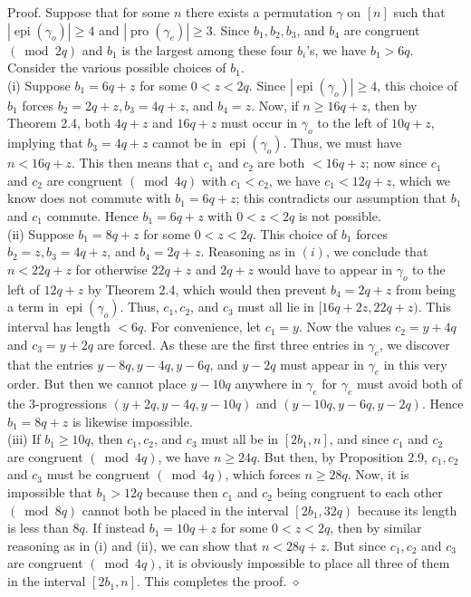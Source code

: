 \documentclass[10pt]{article}
\newcommand{\proofend}{\hfill\(\diamond\)}
\begin{document}
Proof. Suppose that for some $n$ there exists a permutation $\gamma$ on $[n]$ such that $\left|\operatorname{epi}(\gamma_o)\right| \geq 4$ and $\left|\operatorname{pro}\left(\gamma_{e}\right)\right| \geq 3$. Since $b_{1}, b_{2}, b_{3}$, and $b_{4}$ are congruent $(\bmod 2q)$ and $b_{1}$ is the largest among these four $b_i$'s, we have $b_{1}>6q$. Consider the various possible choices of $b_{1}$.\\
(i) Suppose $b_{1}=6 q+z$ for some $0<z<2 q$. Since $|\operatorname{epi}(\gamma_o)| \geq 4$, this choice of $b_{1}$ forces $b_{2}=2 q+z, b_{3}=4 q+z$, and $b_{4}=z$. Now, if $n \geq 16 q+z$, then by Theorem 2.4, both $4 q+z$ and $16 q+z$ must occur in $\gamma_{o}$ to the left of $10 q+z$, implying that $b_{3}=4 q+z$ cannot be in $\operatorname{epi}\left(\gamma_{o}\right)$. Thus, we must have $n<16 q+z$. This then means that $c_{1}$ and $c_{2}$ are both $<16 q+z$; now since $c_{1}$ and $c_{2}$ are congruent $(\bmod 4 q)$ with $c_{1}<c_{2}$, we have $c_{1}<12q+z$, which we know does not commute with $b_{1}=6q+z$; this contradicts our assumption that $b_{1}$ and $c_{1}$ commute. Hence $b_{1}=6 q+z$ with $0<z<2 q$ is not possible.\\
(ii) Suppose $b_{1}=8 q+z$ for some $0<z<2 q$. This choice of $b_{1}$ forces $b_{2}=z, b_{3}=4 q+z$, and $b_{4}=2 q+z$. Reasoning as in $(i)$, we conclude that $n<22 q+z$ for otherwise $22 q+z$ and $2 q+z$ would have to appear in $\gamma_{o}$ to the left of $12 q+z$ by Theorem 2.4, which would then prevent $b_{4}=2 q+z$ from being a term in $\operatorname{epi}\left(\gamma_{o}\right)$. Thus, $c_{1}, c_{2}$, and $c_{3}$ must all lie in $[16 q+2 z, 22 q+z)$. This interval has length $<6 q$. For convenience, let $c_{1}=y$. Now the values $c_{2}=y+4 q$ and $c_{3}=y+2 q$ are forced. As these are the first three entries in $\gamma_{e}$, we discover that the entries $y-8 q, y-4 q, y-6 q$, and $y-2 q$ must appear in $\gamma_{e}$ in this very order. But then we cannot place $y-10 q$ anywhere in $\gamma_{e}$ for $\gamma_{e}$ must avoid both of the 3-progressions $(y+2 q, y-4 q, y-10 q)$ and $(y-10 q, y-6 q, y-2 q)$. Hence $b_{1}=8 q+z$ is likewise impossible.\\
(iii) If $b_{1} \geq 10 q$, then $c_{1}, c_{2}$, and $c_{3}$ must all be in $\left[2 b_{1}, n\right]$, and since $c_{1}$ and $c_{2}$ are congruent $(\bmod 4 q)$, we have $n \geq 24 q$. But then, by Proposition 2.9, $c_{1}, c_{2}$ and $c_{3}$ must be congruent $(\bmod 4 q)$, which forces $n \geq 28 q$. Now, it is impossible that $b_{1}>12 q$ because then $c_{1}$ and $c_{2}$ being congruent to each other $(\bmod 8 q)$ cannot both be placed in the interval $\left[2 b_{1}, 32 q\right)$ because its length is less than $8 q$. If instead $b_{1}=10 q+z$ for some $0<z<2 q$, then by similar reasoning as in (i) and (ii), we can show that $n<28 q+z$. But since $c_{1}, c_{2}$ and $c_{3}$ are congruent $(\bmod 4 q)$, it is obviously impossible to place all three of them in the interval $\left[2 b_{1}, n\right]$. This completes the proof. \proofend
\end{document}
